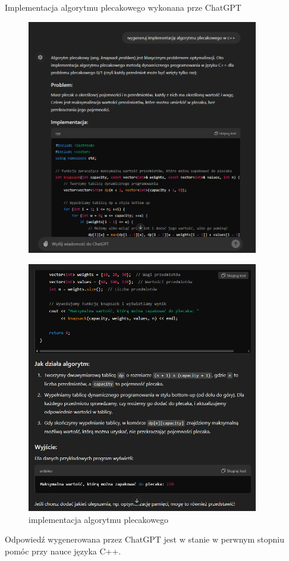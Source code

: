 \documentclass[fleqn,onecolumn,a4paper,12pt,titlepage]{article}
\begin{document}
Implementacja algorytmu plecakowego wykonana prze ChatGPT

\begin{figure}[H]%
    \centering\includegraphics[width=0.9\textwidth]{gen02.png}
    \label{fig:algorytm plecakowy}
\end{figure}
\begin{figure}[H]%
    \centering\includegraphics[width=0.9\textwidth]{gen03.png}
    \caption{implementacja algorytmu plecakowego}
    \label{fig:algorytm plecakowy}
\end{figure}

Odpowiedź wygenerowana przez ChatGPT jest w stanie w perwnym stopniu pomóc przy nauce języka C++.
\end{document}
